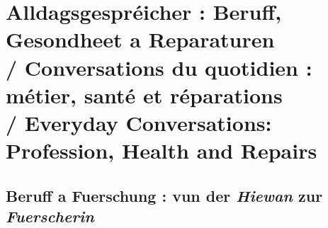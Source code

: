 \vspace{1.5em}

\section[Alldagsgespréicher : Beruff, Gesondheet a Reparaturen]{Alldagsgespréicher : Beruff, Gesondheet a Reparaturen \\/ Conversations du quotidien : métier, santé et réparations \\/ Everyday Conversations: Profession, Health and Repairs}

\subsection{Beruff a Fuerschung : vun der \textit{Hiewan} zur \textit{Fuerscherin}}

